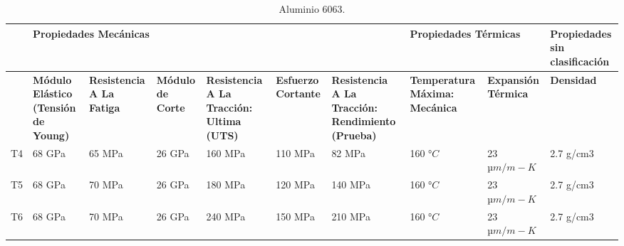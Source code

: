\newpage
\begin{landscape}
	\begin{table}[H]
		\centering
		\small
		\caption{Aluminio 6063.}
		\begin{tabular}{|p{1.5em}|p{5.355em}|p{5.355em}|p{5.355em}|p{5.355em}|p{4.645em}|p{7em}|p{6.285em}|p{5.8em}|p{5.93em}|}
			\hline
			\multicolumn{1}{|r|}{} & \multicolumn{6}{p{39.995em}|}{\cellcolor[rgb]{ .851,  .882,  .949}\textbf{Propiedades Mecánicas}} & \multicolumn{2}{p{13.64em}|}{\cellcolor[rgb]{ .988,  .894,  .839}\textbf{Propiedades Térmicas}} & \cellcolor[rgb]{ 1,  .949,  .8}\textbf{Propiedades sin clasificación} \\
			\hline
			\multicolumn{1}{|r|}{} & \cellcolor[rgb]{ .851,  .882,  .949}\textbf{Módulo Elástico (Tensión de Young)} & \cellcolor[rgb]{ .851,  .882,  .949}\textbf{Resistencia A La Fatiga} & \cellcolor[rgb]{ .851,  .882,  .949}\textbf{Módulo de Corte} & \cellcolor[rgb]{ .851,  .882,  .949}\textbf{Resistencia A La Tracción: Ultima (UTS)} & \cellcolor[rgb]{ .851,  .882,  .949}\textbf{Esfuerzo Cortante} & \cellcolor[rgb]{ .851,  .882,  .949}\textbf{Resistencia A La Tracción: Rendimiento (Prueba)} & \cellcolor[rgb]{ .988,  .894,  .839}\textbf{Temperatura Máxima: Mecánica} & \cellcolor[rgb]{ .988,  .894,  .839}\textbf{Expansión Térmica} & \cellcolor[rgb]{ 1,  .949,  .8}\textbf{Densidad} \\
			\hline
			T4    & 68 GPa & 65 MPa & 26 GPa & 160 MPa & 110 MPa & 82 MPa & 160 $°C$ & 23 $µm/m-K$ & 2.7 g/cm3 \\
			\hline
			T5    & 68 GPa & 70 MPa & 26 GPa & 180 MPa & 120 MPa & 140 MPa & 160 $°C$ & 23 $µm/m-K$ & 2.7 g/cm3 \\
			\hline
			T6    & 68 GPa & 70 MPa & 26 GPa & 240 MPa & 150 MPa & 210 MPa & 160 $°C$ & 23 $µm/m-K$ & 2.7 g/cm3 \\
			\hline
		\end{tabular}%
		\label{tab:Alu6063}%
		
	\end{table}%
\end{landscape}

\bigskip






\endinput 